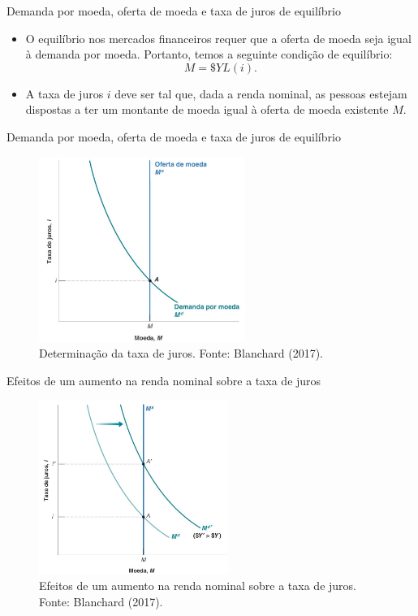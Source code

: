 \documentclass[10pt]{beamer}
\begin{document}
\begin{frame}{Demanda por moeda, oferta de moeda e taxa de juros de equilíbrio}
\begin{itemize}
    \item O equilíbrio nos mercados financeiros requer que a oferta de moeda seja igual à demanda por moeda. Portanto, temos a seguinte condição de equilíbrio:
    \begin{equation}
        M = \$Y L(i).
        \label{eq3}
    \end{equation}
    \bigskip
    \item A taxa de juros $i$ deve ser tal que, dada a renda nominal, as pessoas estejam dispostas a ter um montante de moeda igual à oferta de moeda existente $M$.
\end{itemize}
\end{frame}

\begin{frame}{Demanda por moeda, oferta de moeda e taxa de juros de equilíbrio}
\begin{figure}
    \centering
    \includegraphics[width=0.6\textwidth]{./figures/aula072_fig2.JPG}
    \caption{Determinação da taxa de juros. Fonte: Blanchard (2017).}
    \label{fig2}
\end{figure}
\end{frame}

\begin{frame}{Efeitos de um aumento na renda nominal sobre a taxa de juros}
    \begin{figure}
        \centering
        \includegraphics[width=0.55\textwidth]{./figures/aula072_fig3.JPG}
        \caption{Efeitos de um aumento na renda nominal sobre a taxa de juros. Fonte: Blanchard (2017).}
        \label{fig3}
    \end{figure}
\end{frame}
\end{document}
